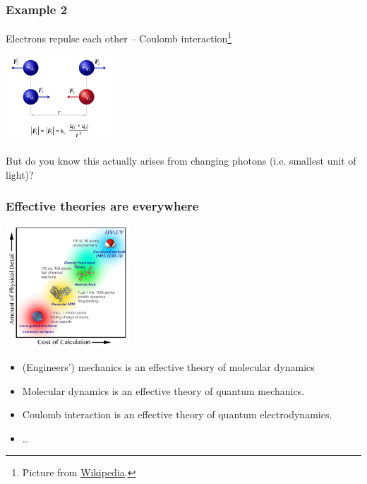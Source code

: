 \documentclass{beamer}
\begin{document}
\begin{frame}
\frametitle{Example 2}

Electrons repulse each other -- Coulomb interaction\footnote{
    Picture from 
    \href{https://en.wikipedia.org/wiki/Coulomb\%27s\_law\#/media/File:CoulombsLaw.svg}{Wikipedia}.
}   

\begin{center}
    \includegraphics[width=0.3\textwidth]{ab-initio/CoulombsLaw.png}
\end{center}

But do you know this actually arises from changing photons (i.e. smallest unit of light)?

\begin{center}
    
\end{center}

\end{frame}

\begin{frame}
\frametitle{Effective theories are everywhere}

\begin{center}
    \includegraphics[width=0.35\textwidth]{newtonian/simulation-scale.png}
\end{center}

\begin{itemize}
    \item (Engineers') mechanics is an effective theory of molecular dynamics
    \item Molecular dynamics is an effective theory of quantum mechanics.
    \item Coulomb interaction is an effective theory of quantum electrodynamics.
    \item \dots
\end{itemize}


\end{frame}
\end{document}
